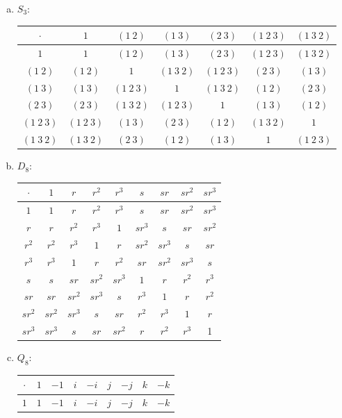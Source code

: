 \documentclass{article}
\begin{document}
\begin{enumerate}[(a)]
  \item $S_3$: \begin{tabular}{c|cccccc}
      $\cdot$ & $1$ & $(1\ 2)$ & $(1\ 3)$ & $(2\ 3)$ & $(1\ 2\ 3)$ & $(1\ 3\ 2)$ \\
      \hline
      $1$ & $1$ & $(1\ 2)$ & $(1\ 3)$ & $(2\ 3)$ & $(1\ 2\ 3)$ & $(1\ 3\ 2)$ \\
      $(1\ 2)$ & $(1\ 2)$ & $1$ & $(1\ 3\ 2)$ & $(1\ 2\ 3)$ & $(2\ 3)$ & $(1\ 3)$ \\
      $(1\ 3)$ & $(1\ 3)$ & $(1\ 2\ 3)$ & $1$ & $(1\ 3\ 2)$ & $(1\ 2)$ & $(2\ 3)$ \\
      $(2\ 3)$ & $(2\ 3)$ & $(1\ 3\ 2)$ & $(1\ 2\ 3)$ & $1$ & $(1\ 3)$ & $(1\ 2)$ \\
      $(1\ 2\ 3)$ & $(1\ 2\ 3)$ & $(1\ 3)$ & $(2\ 3)$ & $(1\ 2)$ & $(1\ 3\ 2)$ & $1$ \\
      $(1\ 3\ 2)$ & $(1\ 3\ 2)$ & $(2\ 3)$ & $(1\ 2)$ & $(1\ 3)$ & $1$ & $(1\ 2\ 3)$
    \end{tabular}
  \item $D_8$: \begin{tabular}{c|cccccccc}
      $\cdot$ & $1$ & $r$ & $r^2$ & $r^3$ & $s$ & $sr$ & $sr^2$ & $sr^3$ \\
      \hline
      $1$ & $1$ & $r$ & $r^2$ & $r^3$ & $s$ & $sr$ & $sr^2$ & $sr^3$ \\
      $r$ & $r$ & $r^2$ & $r^3$ & $1$ & $sr^3$ & $s$ & $sr$ & $sr^2$ \\
      $r^2$ & $r^2$ & $r^3$ & $1$ & $r$ & $sr^2$ & $sr^3$ & $s$ & $sr$ \\
      $r^3$ & $r^3$ & $1$ & $r$ & $r^2$ & $sr$ & $sr^2$ & $sr^3$ & $s$ \\
      $s$ & $s$ & $sr$ & $sr^2$ & $sr^3$ & $1$ & $r$ & $r^2$ & $r^3$ \\
      $sr$ & $sr$ & $sr^2$ & $sr^3$ & $s$ & $r^3$ & $1$ & $r$ & $r^2$ \\
      $sr^2$ & $sr^2$ & $sr^3$ & $s$ & $sr$ & $r^2$ & $r^3$ & $1$ & $r$ \\
      $sr^3$ & $sr^3$ & $s$ & $sr$ & $sr^2$ & $r$ & $r^2$ & $r^3$ & 1
    \end{tabular}
  \item $Q_8$: \begin{tabular}{c|cccccccc}
      $\cdot$ & $1$ & $-1$ & $i$ & $-i$ & $j$ & $-j$ & $k$ & $-k$ \\
      \hline
      $1$ & $1$ & $-1$ & $i$ & $-i$ & $j$ & $-j$ & $k$ & $-k$ \\

\end{tabular}
\end{enumerate}
\end{document}
